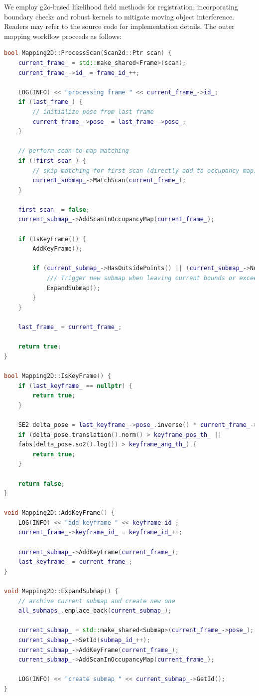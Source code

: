We employ g2o-based likelihood field methods for registration, incorporating boundary checks and robust kernels to mitigate moving object interference. Readers may refer to the source code for implementation details. The outer mapping workflow proceeds as follows:  

\begin{lstlisting}[language=c++,caption=src/ch6/mapping\_2d.cc]
bool Mapping2D::ProcessScan(Scan2d::Ptr scan) {
	current_frame_ = std::make_shared<Frame>(scan);
	current_frame_->id_ = frame_id_++;
	
	LOG(INFO) << "processing frame " << current_frame_->id_;
	if (last_frame_) {
		// initialize pose from last frame
		current_frame_->pose_ = last_frame_->pose_;
	}
	
	// perform scan-to-map matching
	if (!first_scan_) {
		// skip matching for first scan (directly add to occupancy map)
		current_submap_->MatchScan(current_frame_);
	}
	
	first_scan_ = false;
	current_submap_->AddScanInOccupancyMap(current_frame_);
	
	if (IsKeyFrame()) {
		AddKeyFrame();
		
		if (current_submap_->HasOutsidePoints() || (current_submap_->NumFrames()) > 50) {
			/// Trigger new submap when leaving current bounds or exceeding keyframe limit
			ExpandSubmap();
		}
	}
	
	last_frame_ = current_frame_;
	
	return true;
}

bool Mapping2D::IsKeyFrame() {
	if (last_keyframe_ == nullptr) {
		return true;
	}
	
	SE2 delta_pose = last_keyframe_->pose_.inverse() * current_frame_->pose_;
	if (delta_pose.translation().norm() > keyframe_pos_th_ || 
	fabs(delta_pose.so2().log()) > keyframe_ang_th_) {
		return true;
	}
	
	return false;
}

void Mapping2D::AddKeyFrame() {
	LOG(INFO) << "add keyframe " << keyframe_id_;
	current_frame_->keyframe_id_ = keyframe_id_++;
	
	current_submap_->AddKeyFrame(current_frame_);
	last_keyframe_ = current_frame_;
}

void Mapping2D::ExpandSubmap() {
	// archive current submap and create new one
	all_submaps_.emplace_back(current_submap_);
	
	current_submap_ = std::make_shared<Submap>(current_frame_->pose_);
	current_submap_->SetId(submap_id_++);
	current_submap_->AddKeyFrame(current_frame_);
	current_submap_->AddScanInOccupancyMap(current_frame_);
	
	LOG(INFO) << "create submap " << current_submap_->GetId();
}
\end{lstlisting}

